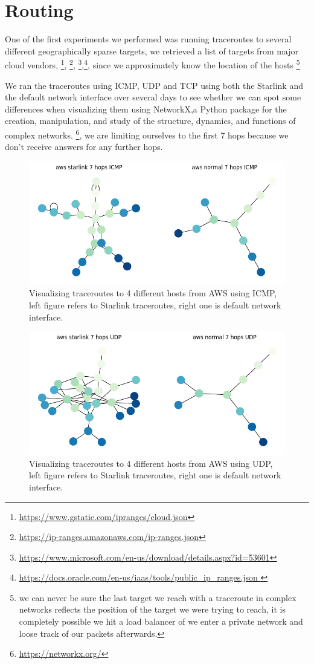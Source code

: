 \documentclass[IN,11pt,twoside,openright,bachelor,english]{tumthesis}
\begin{document}
\section{Routing}

One of the first experiments we performed was running traceroutes to several different geographically sparse targets, we retrieved a list of targets from major cloud vendors, \footnote{\url{ https://www.gstatic.com/ipranges/cloud.json}}, \footnote{\url{https://ip-ranges.amazonaws.com/ip-ranges.json}}, \footnote{\url{https://www.microsoft.com/en-us/download/details.aspx?id=53601}},\footnote{\url{https://docs.oracle.com/en-us/iaas/tools/public_ip_ranges.json }}, since we approximately know the location of the hosts \footnote{we can never be sure the last target we reach with a traceroute in complex networks reflects the position of the target we were trying to reach, it is completely possible we hit a load balancer of we enter a private network and loose track of our packets afterwards.}

We ran the traceroutes using ICMP, UDP and TCP using both the Starlink and the default network interface over several days to see whether we can spot some differences when visualizing them using NetworkX,a Python package for the creation, manipulation, and study of the structure, dynamics, and functions of complex networks. \footnote{\url{https://networkx.org/}}, we are limiting ourselves to the first 7 hops because we don't receive answers for any further hops. 



\begin{figure}
	\label{fig:tr_aws_icmp}
	\centering
	\includegraphics[width=0.6\columnwidth]{img/tr_aws_icmp.png}
	\caption{Visualizing traceroutes to 4 different hosts from AWS using ICMP, left figure refers to Starlink traceroutes, right one is default network interface.}
\end{figure}


\begin{figure}
	\label{fig:tr_aws_udp}
	\centering
	\includegraphics[width=0.6\columnwidth]{img/tr_aws_udp.png}
	\caption{Visualizing traceroutes to 4 different hosts from AWS using UDP, left figure refers to Starlink traceroutes, right one is default network interface.}
\end{figure}
\end{document}
